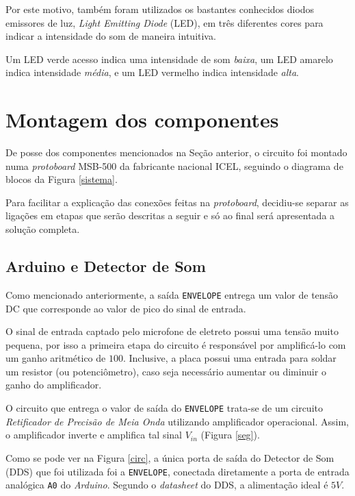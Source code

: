 \documentclass[
    12pt,               %
    openright,          %
    oneside,
    a4paper,            
    english,            %
    brazil              %
    ]{abntex2}
\begin{document}
Por este motivo, também foram utilizados os bastantes conhecidos diodos emissores de luz, \textit{Light Emitting Diode} (LED), em três diferentes cores para indicar a intensidade do som de maneira intuitiva. 

Um LED verde acesso indica uma intensidade de som \textit{baixa}, um LED amarelo indica intensidade \textit{média}, e um LED vermelho indica intensidade \textit{alta}.

\section{Montagem dos componentes}\label{montagem}

De posse dos componentes mencionados na Seção anterior, o circuito foi montado numa \textit{protoboard} MSB-500 da fabricante nacional ICEL, seguindo o diagrama de blocos da Figura \ref{sistema}.

Para facilitar a explicação das conexões feitas na \textit{protoboard}, decidiu-se separar as ligações em etapas que serão descritas a seguir e só ao final será apresentada a solução completa.

\subsection{Arduino e Detector de Som}

Como mencionado anteriormente, a saída \texttt{ENVELOPE} entrega um valor de tensão DC que corresponde ao valor de pico do sinal de entrada. 

O sinal de entrada captado pelo microfone de eletreto possui uma tensão muito pequena, por isso a primeira etapa do circuito é responsável por amplificá-lo com um ganho aritmético de $100$. Inclusive, a placa possui uma entrada para soldar um resistor (ou potenciômetro), caso seja necessário aumentar ou diminuir o ganho do amplificador. 

O circuito que entrega o valor de saída do \texttt{ENVELOPE} trata-se de um circuito \textit{Retificador de Precisão de Meia Onda} utilizando amplificador operacional. Assim, o amplificador inverte e amplifica tal sinal $V_{in}$ (Figura \ref{seg}).

Como se pode ver na Figura \ref{circ}, a única porta de saída do Detector de Som (DDS) que foi utilizada foi a \texttt{ENVELOPE}, conectada diretamente a porta de entrada analógica \texttt{A0} do \textit{Arduino}. Segundo o \textit{datasheet} do DDS, a alimentação ideal é $5V$.
\end{document}
